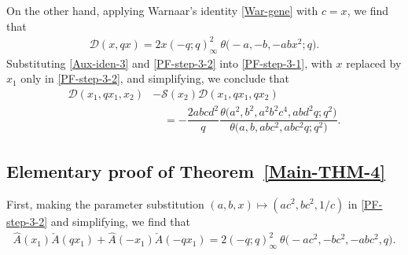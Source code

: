 \documentclass[12pt,reqno]{amsart}
\numberwithin{equation}{section}
\theoremstyle{plain}
\theoremstyle{definition}
\begin{document}
On the other hand, applying Warnaar's identity \eqref{War-gene} with $c=x$, we find that
\begin{align}
\mathscr{D}(x,qx)=2x(-q;q)_\infty^2\!\:\theta\big({-}a,-b,-abx^2;q\big).
\label{PF-step-3-2}
\end{align}
Substituting \eqref{Aux-iden-3} and \eqref{PF-step-3-2} into \eqref{PF-step-3-1}, with
$x$ replaced by $x_1$ only in \eqref{PF-step-3-2}, and simplifying, we conclude that
\begin{align*}
\mathscr{D}(x_1,qx_1,x_2) &-\mathscr{S}(x_2)\mathscr{D}(x_1,qx_1,qx_2)\nonumber\\
 &\quad=-\dfrac{2abcd^2}{q}\dfrac{\theta\big(a^2,b^2,a^2b^2c^4,abd^2q;q^2\big)}
{\theta\big(a,b,abc^2,abc^2q;q^2\big)}.
\end{align*}


\subsection{Elementary proof of Theorem~\ref{Main-THM-4}}
First, making the parameter substitution $(a,b,x)\mapsto(ac^2,bc^2,1/c)$ in
\eqref{PF-step-3-2} and simplifying, we find that
\begin{align}
\hat{A}(x_1)\check{A}(qx_1)+\hat{A}(-x_1)\check{A}(-qx_1)=2(-q;q)_\infty^2\!\:\theta
\big({-}ac^2,-bc^2,-abc^2,q\big).\label{PF-step-4-1}
\end{align}
\end{document}
